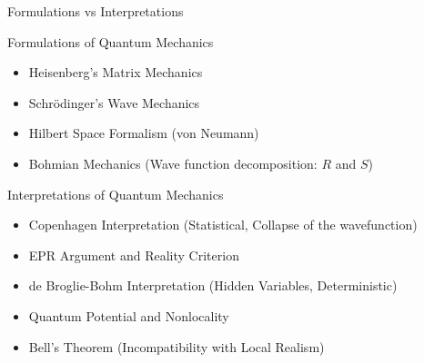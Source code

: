 \begin{frame}{Formulations vs Interpretations}

  \begin{minipage}[t]{0.43\textwidth} %
    \begin{block}{Formulations of Quantum Mechanics}
      \vspace{0.2cm}
      \begin{itemize}
        \item Heisenberg's Matrix Mechanics
        \item Schrödinger's Wave Mechanics
        \item Hilbert Space Formalism (von Neumann)
        \item Bohmian Mechanics (Wave function decomposition: $R$ and $S$)
      \end{itemize}
    \end{block}
  \end{minipage}
  \hfill
  \pause
  \begin{minipage}[t]{0.53\textwidth} %
    \begin{block}{Interpretations of Quantum Mechanics}
    \vspace{0.2cm}
      \begin{itemize}
        \item Copenhagen Interpretation (Statistical, Collapse of the wavefunction)
        \item EPR Argument and Reality Criterion
        \item de Broglie-Bohm Interpretation (Hidden Variables, Deterministic)
        \item Quantum Potential and Nonlocality
        \item Bell's Theorem (Incompatibility with Local Realism)
      \end{itemize}
    \end{block}
  \end{minipage}

\end{frame}


